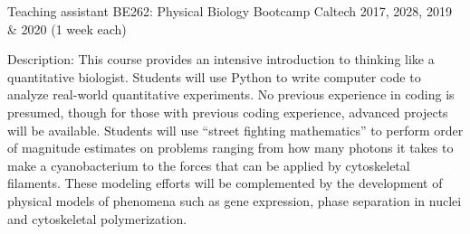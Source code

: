 

\begin{cventries}

  \cventry
    {Teaching assistant} %
    {BE262: Physical Biology Bootcamp} %
    {Caltech} %
    {2017, 2028, 2019 \& 2020 (1 week each)} %
    {
      \begin{cvitems} %
        \item {Description: This course provides an intensive introduction to 
        thinking like a quantitative biologist. Students will use Python to 
        write computer code to analyze real-world quantitative experiments. No
        previous experience in coding is presumed, though for those with 
        previous coding experience, advanced projects will be available. 
        Students will use “street fighting mathematics” to perform order of 
        magnitude estimates on problems ranging from how many photons it takes 
        to make a cyanobacterium to the forces that can be applied by 
        cytoskeletal filaments. These modeling efforts will be complemented by 
        the development of physical models of phenomena such as gene expression,
        phase separation in nuclei and cytoskeletal polymerization.}
      \end{cvitems}
    }


\end{cventries}
